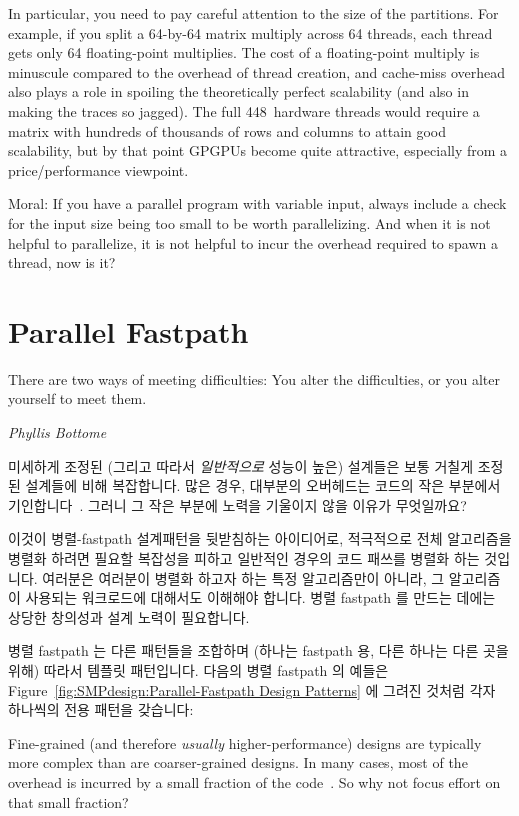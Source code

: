 {	In particular, you need to pay careful attention to the
	size of the partitions.
	For example, if you split a 64-by-64 matrix multiply across
	64 threads, each thread gets only 64 floating-point multiplies.
	The cost of a floating-point multiply is minuscule compared to
	the overhead of thread creation, and cache-miss overhead
	also plays a role in spoiling the theoretically perfect scalability
	(and also in making the traces so jagged).
	The full 448~hardware threads would require a matrix with
	hundreds of thousands of rows and columns to attain good
	scalability, but by that point GPGPUs become quite attractive,
	especially from a price/performance viewpoint.

	Moral: If you have a parallel program with variable input,
	always include a check for the input size being too small to
	be worth parallelizing.
	And when it is not helpful to parallelize, it is not helpful
	to incur the overhead required to spawn a thread, now is it?

	\fi
}\QuickQuizEnd

\section{Parallel Fastpath}
\label{sec:SMPdesign:Parallel Fastpath}
%
\epigraph{There are two ways of meeting difficulties: You alter the
	  difficulties, or you alter yourself to meet them.}
	 {\emph{Phyllis Bottome}}

미세하게 조정된 (그리고 따라서 \emph{일반적으로} 성능이 높은) 설계들은 보통
거칠게 조정된 설계들에 비해 복잡합니다.
많은 경우, 대부분의 오버헤드는 코드의 작은 부분에서 기인합니다~\cite{Knuth73}.
그러니 그 작은 부분에 노력을 기울이지 않을 이유가 무엇일까요?

이것이 병렬-fastpath 설계패턴을 뒷받침하는 아이디어로, 적극적으로 전체
알고리즘을 병렬화 하려면 필요할 복잡성을 피하고 일반적인 경우의 코드 패쓰를
병렬화 하는 것입니다.
여러분은 여러분이 병렬화 하고자 하는 특정 알고리즘만이 아니라, 그 알고리즘이
사용되는 워크로드에 대해서도 이해해야 합니다.
병렬 fastpath 를 만드는 데에는 상당한 창의성과 설계 노력이 필요합니다.

병렬 fastpath 는 다른 패턴들을 조합하며 (하나는 fastpath 용, 다른 하나는 다른
곳을 위해) 따라서 템플릿 패턴입니다.
다음의 병렬 fastpath 의 예들은
Figure~\ref{fig:SMPdesign:Parallel-Fastpath Design Patterns} 에 그려진 것처럼
각자 하나씩의 전용 패턴을 갖습니다:

\iffalse

Fine-grained (and therefore \emph{usually} higher-performance)
designs are typically more complex than are coarser-grained designs.
In many cases, most of the overhead is incurred by a small fraction
of the code~\cite{Knuth73}.
So why not focus effort on that small fraction?

